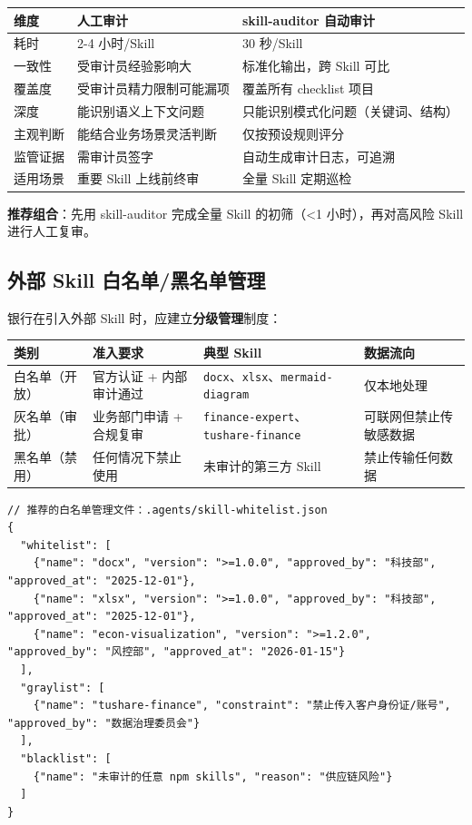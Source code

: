 \begin{table}[H]
\centering
\begin{tabular}{p{3.5cm}p{5cm}p{5cm}}
\toprule
\textbf{维度} & \textbf{人工审计} & \textbf{skill-auditor 自动审计} \\
\midrule
耗时 & 2-4 小时/Skill & 30 秒/Skill \\
一致性 & 受审计员经验影响大 & 标准化输出，跨 Skill 可比 \\
覆盖度 & 受审计员精力限制可能漏项 & 覆盖所有 checklist 项目 \\
深度 & 能识别语义上下文问题 & 只能识别模式化问题（关键词、结构） \\
主观判断 & 能结合业务场景灵活判断 & 仅按预设规则评分 \\
监管证据 & 需审计员签字 & 自动生成审计日志，可追溯 \\
适用场景 & 重要 Skill 上线前终审 & 全量 Skill 定期巡检 \\
\bottomrule
\end{tabular}
\end{table}

\textbf{推荐组合}：先用 skill-auditor 完成全量 Skill 的初筛（<1 小时），再对高风险 Skill 进行人工复审。

\subsection{外部 Skill 白名单/黑名单管理}

银行在引入外部 Skill 时，应建立\textbf{分级管理}制度：

\begin{table}[H]
\centering
\begin{tabular}{lp{3cm}p{5cm}p{4cm}}
\toprule
\textbf{类别} & \textbf{准入要求} & \textbf{典型 Skill} & \textbf{数据流向} \\
\midrule
白名单（开放） & 官方认证 + 内部审计通过 & \texttt{docx}、\texttt{xlsx}、\texttt{mermaid-diagram} & 仅本地处理 \\
灰名单（审批） & 业务部门申请 + 合规复审 & \texttt{finance-expert}、\texttt{tushare-finance} & 可联网但禁止传敏感数据 \\
黑名单（禁用） & 任何情况下禁止使用 & 未审计的第三方 Skill & 禁止传输任何数据 \\
\bottomrule
\end{tabular}
\end{table}

\begin{lstlisting}[style=json]
// 推荐的白名单管理文件：.agents/skill-whitelist.json
{
  "whitelist": [
    {"name": "docx", "version": ">=1.0.0", "approved_by": "科技部", "approved_at": "2025-12-01"},
    {"name": "xlsx", "version": ">=1.0.0", "approved_by": "科技部", "approved_at": "2025-12-01"},
    {"name": "econ-visualization", "version": ">=1.2.0", "approved_by": "风控部", "approved_at": "2026-01-15"}
  ],
  "graylist": [
    {"name": "tushare-finance", "constraint": "禁止传入客户身份证/账号", "approved_by": "数据治理委员会"}
  ],
  "blacklist": [
    {"name": "未审计的任意 npm skills", "reason": "供应链风险"}
  ]
}
\end{lstlisting}

